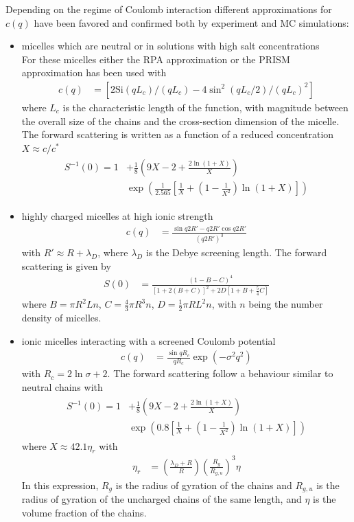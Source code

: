 Depending on the regime of Coulomb interaction different approximations for $c(q)$ have been favored and confirmed both by experiment and MC simulations:
\begin{itemize}
  \item micelles which are neutral or in solutions with high salt concentrations\\
  For these micelles either the RPA approximation or the PRISM approximation has been used with
  \begin{align}
c(q) &= \left[2 \textrm{Si}(qL_c)/(qL_c)-4\sin^2(qL_c/2)/(qL_c)^2\right]
\end{align}
where $L_c$ is the characteristic length of the function, with magnitude between
the overall size of the chains and the cross-section dimension of the micelle. The forward scattering is written as a function of a reduced concentration $X \approx c/c^*$
\begin{align}
\begin{split}
  S^{-1}(0) = 1&+\frac18\left(9X-2+\frac{2\ln(1+X)}{X}\right) \\
               & \exp\left(\frac{1}{2.565}\left[\frac{1}{X}+\left(1-\frac{1}{X^2}\right)\ln(1+X)\right]\right)
\end{split}
\end{align}
  \item highly charged micelles at high ionic strength
  \begin{align}
c(q) &= \frac{\sin q2R'-q2R'\cos q2R'}{(q2R')^3}
\end{align}
with $R'\approx R+\lambda_D$, where $\lambda_D$ is the Debye screening length. The forward scattering is given by
\begin{align}\label{eq:S0wlm_charged}
  S(0) &= \frac{(1-B-C)^4}{[1+2(B+C)]^2+2D[1+B+\frac54 C]}
\end{align}
where $B=\pi R^2Ln$, $C=\frac43\pi R^3n$, $D=\frac12\pi RL^2n$, with $n$ being the number density of micelles.\\
  \item ionic micelles interacting with a screened Coulomb potential
  \begin{align}
c(q) &= \frac{\sin qR_c}{qR_c}\exp\left(-\sigma^2q^2\right)
\end{align}
with $R_c=2\ln \sigma +2$. The forward scattering follow a behaviour similar to neutral chains with
\begin{align}\label{eq:S0wlm_screenedCoulomb}
\begin{split}
  S^{-1}(0) = 1&+\frac18\left(9X-2+\frac{2\ln(1+X)}{X}\right) \\
               & \exp\left(0.8\left[\frac{1}{X}+\left(1-\frac{1}{X^2}\right)\ln(1+X)\right]\right)
\end{split}
\end{align}
where $X\approx 42.1 \eta_r$ with
\begin{align}
  \eta_r &= \left(\frac{\lambda_D+R}{R}\right)\left(\frac{R_g}{R_{g,u}}\right)^3\eta
\end{align}
In this expression, $R_g$ is the radius of gyration of the chains and $R_{g,u}$ is the radius
of gyration of the uncharged chains of the same length, and $\eta$ is the volume
fraction of the chains.
\end{itemize}

